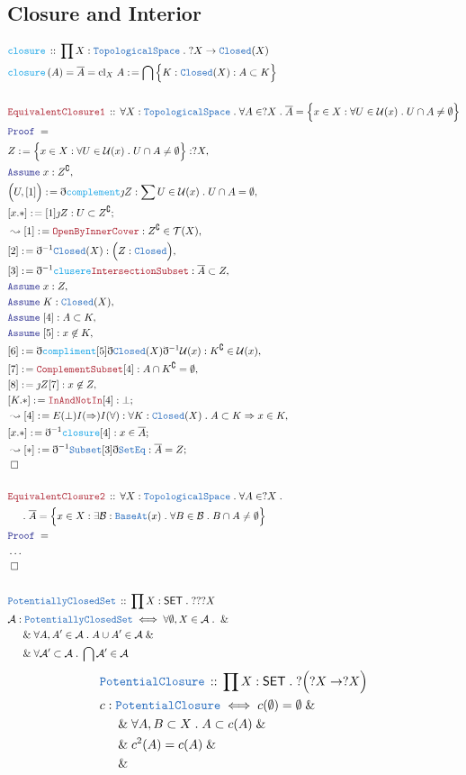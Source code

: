 \documentclass[12pt]{scrartcl}
\newcommand{\TYPE}[1]{\textcolor{NavyBlue}{\mathtt{#1}}}
\newcommand{\FUNC}[1]{\textcolor{Cerulean}{\mathtt{#1}}}
\newcommand{\LOGIC}[1]{\textcolor{Blue}{\mathtt{#1}}}
\newcommand{\THM}[1]{\textcolor{Maroon}{\mathtt{#1}}}
\renewcommand{\.}{\; . \;}
\newcommand{\de}{: \kern 0.1pc =}
\newcommand{\Act}[1]{\left( #1 \right)}
\newcommand{\Theorem}[2]{& \THM{#1} \, :: \, #2 \\ & \Proof = \\ }
\newcommand{\DeclareType}[2]{& \TYPE{#1} \, :: \, #2 \\}
\newcommand{\DefineType}[3]{& #1 : \TYPE{#2} \iff #3 \\}
\newcommand{\DeclareFunc}[2]{& \FUNC{#1} \, :: \, #2 \\}
\newcommand{\DefineNamedFunc}[4]{&  \FUNC{#1}\Act{#2} = #3 \de #4 \\}
\newcommand{\NewLine}{\\ & \kern 1pc}
\newcommand{\Page}[1]{ \begin{align*} #1 \end{align*}   }
\newcommand{ \bd }{ \ByDef }
\newcommand{\NoProof}{ & \ldots \\ \EndProof}
\renewcommand{\And}{\; \& \;}
\newcommand{\Imply}{\Rightarrow}
\renewcommand{\c}{\complement}
\newcommand{\Say}[3]{& #1 \de #2 : #3, \\}
\newcommand{\Conclude}[3]{& #1 \de #2 : #3; \\}
\newcommand{\Derive}[3]{& \leadsto #1 \de #2 : #3, \\}
\newcommand{\DeriveConclude}[3]{& \leadsto #1 \de #2 : #3 ; \\}
\newcommand{\Assume}[2]{& \LOGIC{Assume} \; #1 : #2, \\}
\newcommand{\QED}{\; \square}
\newcommand{\EndProof}{& \QED \\}
\newcommand{\ByDef}{\eth}
\newcommand{\ByConstr}{\jmath}
\newcommand{\Proof}{\LOGIC{Proof} \; }
\newcommand{\A}{\mathcal{A}}
\newcommand{\B}{\mathcal{B}}
\newcommand{\SET}{\mathsf{SET}}
\newcommand{\TS}{\TYPE{TopologicalSpace}}
\newcommand{\T}{\mathcal{T}}
\newcommand{\U}{\mathcal{U}}
\begin{document}
\subsection{Closure and Interior}
\Page{
	\DeclareFunc{closure}
	{
		\prod X : \TS \. 
		?X \to \TYPE{Closed}(X) 
	}
	\DefineNamedFunc{closure}{A}{\overline{A} = \mathrm{cl}_X\;A}
	{ \bigcap \Big\{ K : \TYPE{Closed}(X) : A \subset K  \Big\}     }
	\\
	\Theorem{EquivalentClosure1}{
		\forall X : \TS \.
		\forall A \in ?X \.
		\overline{A} = 
		\Big\{x \in X : \forall U \in \U(x) \. U \cap A \neq \emptyset  \Big\}
	}
	\Say{Z}{\Big\{x \in X : \forall U \in \U(x) \. U \cap A \neq \emptyset\Big\}} 
	{?X}
	\Assume{x}{Z^\c}
	\Say{\Big(U,[1]\Big)}{\bd \FUNC{complement}\ByConstr Z}{
		\sum U \in \U(x) \. 
		U \cap A = \emptyset
	}
	\Conclude{[x.*]}{[1]\ByConstr Z}{ U \subset Z^\c}
	\Derive{[1]}{\THM{OpenByInnerCover}}{ Z^\c \in \T(X)  }
	\Say{[2]}{\bd^{-1} \TYPE{Closed}(X)}
	{
		\Big(
			Z : \TYPE{Closed}
		\Big)
	}
	\Say{[3]}{\bd^{-1} \FUNC{clusere} \THM{IntersectionSubset} }
	{
		\overline{A} \subset Z
	}
	\Assume{x}{Z}
	\Assume{K}{\TYPE{Closed}(X)}
	\Assume{[4]}{ A \subset K}
	\Assume{[5]}{x \not \in K}
	\Say{[6]}{\bd \FUNC{compliment}[5]\bd \TYPE{Closed}(X)\bd^{-1} \U(x) }
	{ K^\c \in \U(x)  }
	\Say{[7]}{\THM{ComplementSubset}[4]}{A \cap K^\c = \emptyset}
	\Say{[8]}{\ByConstr Z [7]}{x \not \in Z}
	\Conclude{[K.*]}{\THM{InAndNotIn}[4]}{\bot}
	\Derive{[4]}{E(\bot)I(\Imply)I(\forall)}
	{
		\forall K : \TYPE{Closed}(X) \. A \subset K \Imply x \in K
	}
	\Conclude{[x.*]}{\bd^{-1} \FUNC{closure}[4]}
	{
		x \in \overline{A}
	}
	\DeriveConclude{[*]}{\bd^{-1}\TYPE{Subset}[3]\bd \TYPE{SetEq}}
	{ \overline{A} = Z }
	\EndProof 
	\\
	\Theorem{EquivalentClosure2}{
		\forall X : \TS \.
		\forall A \in ?X \.
		\NewLine \.
		\overline{A} = 
		\Big\{x \in X : \exists \B : \TYPE{BaseAt}(x) \.  \forall B \in \B \.
		B \cap A \neq \emptyset  \Big\}
	}
	\NoProof
	\\
	\DeclareType{PotentiallyClosedSet}
	{
		\prod X : \SET \. ???X		
	}
	\DefineType{\A}{PotentiallyClosedSet}{
		\forall \emptyset, X \in \A \.  \And \NewLine \And
		\forall A,A' \in \A \. A \cup A' \in \A  \And \NewLine \And
		\forall \A' \subset \A \. \bigcap \A' \in \A
	}
}\Page{
	\DeclareType{PotentialClosure}
	{
		\prod X : \SET \. ?\Big(?X \to ?X\Big)
	}	
	\DefineType{c}{PotentialClosure}
	{
		c(\emptyset) = \emptyset \And \NewLine \And
		\forall A,B \subset X \. 
		A \subset c(A) 
		\And \NewLine \And 
		c^2(A) = c(A)
		\And \NewLine \And 
}}
\end{document}
